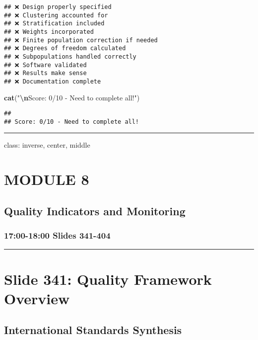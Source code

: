 \documentclass[
]{article}
\newenvironment{Shaded}{\begin{snugshade}}{\end{snugshade}}
\newcommand{\FunctionTok}[1]{\textcolor[rgb]{0.13,0.29,0.53}{\textbf{#1}}}
\newcommand{\NormalTok}[1]{#1}
\newcommand{\SpecialCharTok}[1]{\textcolor[rgb]{0.81,0.36,0.00}{\textbf{#1}}}
\newcommand{\StringTok}[1]{\textcolor[rgb]{0.31,0.60,0.02}{#1}}
\begin{document}
\begin{verbatim}
## ❌ Design properly specified 
## ❌ Clustering accounted for 
## ❌ Stratification included 
## ❌ Weights incorporated 
## ❌ Finite population correction if needed 
## ❌ Degrees of freedom calculated 
## ❌ Subpopulations handled correctly 
## ❌ Software validated 
## ❌ Results make sense 
## ❌ Documentation complete
\end{verbatim}

\begin{Shaded}
\begin{Highlighting}[]
\FunctionTok{cat}\NormalTok{(}\StringTok{"}\SpecialCharTok{\textbackslash{}n}\StringTok{Score: 0/10 {-} Need to complete all!"}\NormalTok{)}
\end{Highlighting}
\end{Shaded}

\begin{verbatim}
## 
## Score: 0/10 - Need to complete all!
\end{verbatim}

\begin{center}\rule{0.5\linewidth}{0.5pt}\end{center}

class: inverse, center, middle

\section{MODULE 8}\label{module-8}

\subsection{Quality Indicators and
Monitoring}\label{quality-indicators-and-monitoring}

\subsubsection{17:00-18:00 \textbar{} Slides
341-404}\label{slides-341-404}

\begin{center}\rule{0.5\linewidth}{0.5pt}\end{center}

\section{Slide 341: Quality Framework
Overview}\label{slide-341-quality-framework-overview}

\subsection{International Standards
Synthesis}\label{international-standards-synthesis}
\end{document}
